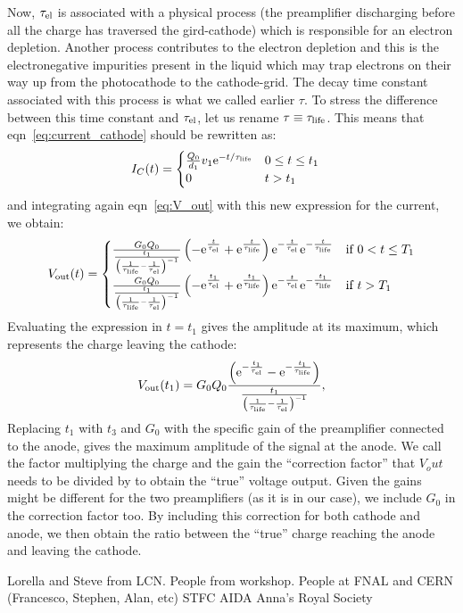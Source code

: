 \documentclass[a4paper,11pt]{article}
\providecommand*{\eu}%
{\ensuremath{\mathrm{e}}}
\begin{document}
Now, $\tau_{\rm el}$ is associated with a physical process (the preamplifier discharging before all the charge has traversed the gird-cathode) which is responsible for an electron depletion. Another process contributes to the electron depletion and this is the electronegative impurities present in the liquid which may trap electrons on their way up from the photocathode to the cathode-grid. The decay time constant associated with this process is what we called earlier $\tau$. To stress the difference between this time constant and $\tau_{\rm el}$, let us rename $\tau \equiv \tau_{\rm life}$.
This means that eqn~\ref{eq:current_cathode} should be rewritten as:
\begin{align}
 I_C(t) &=
  \begin{cases}
   \frac{Q_0}{d_1}v_{1} \eu^{-t/\tau_{\rm life}}  
                            & 0 \leq t \leq t_{1} \\
   0        			    & t > t_{1}
  \end{cases}
  \label{eq:current_cathode}
\end{align}
and integrating again eqn~\ref{eq:V_out} with this new expression for the current, we obtain:
\begin{equation}
V_{\rm out} (t) = \begin{cases}
\frac{G_0 Q_0
}{
\frac{t_{1}}{\left (\frac{1}{\tau_{\rm life}}-\frac{1}{\tau_{\rm el}}\right )^{-1}}
} \left(-\eu^{\frac{t}{\tau_{\rm el}}}+\eu^{\frac{t}{\tau_{\rm life}}}\right) \eu^{-\frac{t}{\tau_{\rm el}}} \eu^{-\frac{t}{\tau_{\rm life}}} &\text{if $0 < t \leq T_1$}\\
\frac{G_0 Q_0
}{
\frac{t_{1}}{\left (\frac{1}{\tau_{\rm life}}-\frac{1}{\tau_{\rm el}}\right )^{-1}}
} \left(-\eu^{\frac{t_1}{\tau_{\rm el}}}+\eu^{\frac{t_1}{\tau_{\rm life}}}\right) \eu^{-\frac{t}{\tau_{\rm el}}} \eu^{-\frac{t_1}{\tau_{\rm life}}} &\text{if $t > T_1$}
\end{cases}
\end{equation}
Evaluating the expression in $t=t_1$ gives the amplitude at its maximum, which represents the charge leaving the cathode: 
\begin{equation}
V_{\rm out}(t_1) = G_0 Q_0 \frac{
\left(\eu^{-\frac{t_1}{\tau_{\rm el}}}-\eu^{-\frac{t_1}{\tau_{\rm life}}}\right)
}{
\frac{t_{1}}{\left (\frac{1}{\tau_{\rm life}}-\frac{1}{\tau_{\rm el}}\right )^{-1}}
},
\end{equation}
Replacing $t_1$ with $t_3$ and $G_0$ with the specific gain of the preamplifier connected to the anode, gives the maximum amplitude of the signal at the anode. 
We call the factor multiplying the charge and the gain the ``correction factor'' that $V_out$ needs to be divided by to obtain the ``true'' voltage output. Given the gains might be different for the two preamplifiers (as it is in our case), we include $G_0$ in the correction factor too. By including this correction for both cathode and anode, we then obtain the ratio between the ``true'' charge reaching the anode and leaving the cathode. 

\acknowledgments
Lorella and Steve from LCN.
People from workshop.
People at FNAL and CERN (Francesco, Stephen, Alan, etc)
STFC
AIDA
Anna's Royal Society


\begingroup
    \setlength{\bibsep}{10pt}
    
\endgroup
\end{document}
